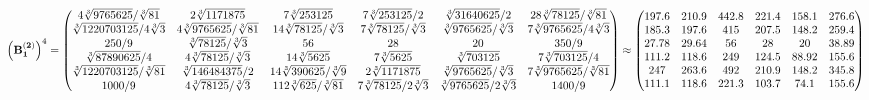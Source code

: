 \documentclass[10pt,a4paper]{article}
\begin{document}
	\[
		\left(\bold{B_1^{(2)}}\right)^{4} = 
		\begin{pmatrix}
			{{4}\sqrt[3]{9765625}} / {\sqrt[3]{81}} & {{2}\sqrt[3]{1171875}}{} & {{7}\sqrt[3]{253125}}{} & {{7}\sqrt[3]{253125}} / {{2}} & {\sqrt[3]{31640625}} / {{2}} & {{28}\sqrt[3]{78125}} / {\sqrt[3]{81}} \\
			{\sqrt[3]{1220703125}} / {{4}\sqrt[3]{3}} & {{4}\sqrt[3]{9765625}} / {\sqrt[3]{81}} & {{14}\sqrt[3]{78125}} / {\sqrt[3]{3}} & {{7}\sqrt[3]{78125}} / {\sqrt[3]{3}} & {\sqrt[3]{9765625}} / {\sqrt[3]{3}} & {{7}\sqrt[3]{9765625}} / {{4}\sqrt[3]{3}} \\
			{{250}} / {{9}} & {\sqrt[3]{78125}} / {\sqrt[3]{3}} & {{56}}{} & {{28}}{} & {{20}}{} & {{350}} / {{9}} \\
			{\sqrt[3]{87890625}} / {{4}} & {{4}\sqrt[3]{78125}} / {\sqrt[3]{3}} & {{14}\sqrt[3]{5625}}{} & {{7}\sqrt[3]{5625}}{} & {\sqrt[3]{703125}}{} & {{7}\sqrt[3]{703125}} / {{4}} \\
			{\sqrt[3]{1220703125}} / {\sqrt[3]{81}} & {\sqrt[3]{146484375}} / {{2}} & {{14}\sqrt[3]{390625}} / {\sqrt[3]{9}} & {{2}\sqrt[3]{1171875}}{} & {\sqrt[3]{9765625}} / {\sqrt[3]{3}} & {{7}\sqrt[3]{9765625}} / {\sqrt[3]{81}} \\
			{{1000}} / {{9}} & {{4}\sqrt[3]{78125}} / {\sqrt[3]{3}} & {{112}\sqrt[3]{625}} / {\sqrt[3]{81}} & {{7}\sqrt[3]{78125}} / {{2}\sqrt[3]{3}} & {\sqrt[3]{9765625}} / {{2}\sqrt[3]{3}} & {{1400}} / {{9}} \\
		\end{pmatrix}
		\approx
		\begin{pmatrix}
			197.6    & 210.9    & 442.8    & 221.4    & 158.1    & 276.6    \\
			185.3    & 197.6    & 415      & 207.5    & 148.2    & 259.4    \\
			27.78    & 29.64    & 56       & 28       & 20       & 38.89    \\
			111.2    & 118.6    & 249      & 124.5    & 88.92    & 155.6    \\
			247      & 263.6    & 492      & 210.9    & 148.2    & 345.8    \\
			111.1    & 118.6    & 221.3    & 103.7    & 74.1     & 155.6    \\
		\end{pmatrix}
	\]
\end{document}
